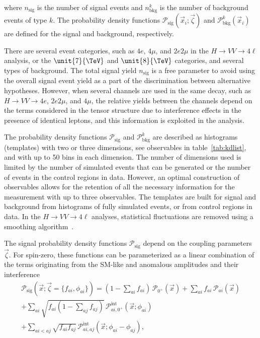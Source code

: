 where $n_\text{sig}$ is the number of signal events and $n_\text{bkg}^k$ is the number of background events of type $k$.
The probability density functions $\mathcal{P}_\text{sig}(\vec{x}_{i};\vec{\zeta})$ and $\mathcal{P}_\text{bkg}^k(\vec{x}_{i})$
are defined for the signal and background, respectively.

There are several event categories, such as $4e$, $4\mu$, and $2e2\mu$ in the
$H\to VV \to 4\ell$ analysis, or the $\unit{7}{\TeV}$ and $\unit{8}{\TeV}$ categories, and several types of background.
The total signal yield $n_\text{sig}$ is a free parameter to avoid
using the overall signal event yield as a part of the discrimination between alternative hypotheses.
However, when several channels are used in the same decay,
such as $H \to VV \to 4e$, $2e2\mu$, and $4\mu$,
the relative yields between the channels depend on the terms considered in the tensor structure
due to interference effects in the presence of identical leptons,
and this information is exploited in the analysis.

The probability density functions $\mathcal{P}_\text{sig}$ and  $\mathcal{P}_\text{bkg}^k$ are described
as histograms (templates) with two or three dimensions, see observables in table~\ref{tab:kdlist},
and with up to 50 bins in each dimension. The number of dimensions used is limited by the number
of simulated events that can be generated or the number of events in the control regions in data.
However, an optimal construction of observables allows for the retention of all the necessary information for
the measurement with up to three observables. The templates are built for signal and background from
histograms of fully simulated events, or from control regions in data. In the $H\to VV \to 4\ell$ analyses, statistical fluctuations are removed using a smoothing algorithm~\cite{rosenblatt1956, parzen1962}.

The signal probability density functions $\mathcal{P}_\text{sig}$ depend on the coupling parameters $\vec{\zeta}$.
For spin-zero, these functions can be parameterized as a linear combination of the terms originating from
the SM-like and anomalous amplitudes and their interference~\cite{Anderson:2013afp}
\begin{multline}
\mathcal{P}_\text{sig}\left(\vec{x}; \vec{\zeta}=\{f_{ai},\phi_{ai}\}\right) =  \left(1-\sum_{ai} f_{ai}\right) \, \mathcal{P}_{0^+}\left(\vec{x}\right)
 + \sum_{ai} f_{ai} \, \mathcal{P}_{ai}\left(\vec{x}\right)  \\
+ \sum_{ai} \sqrt{f_{ai}\left(1-\sum_{aj} f_{aj}\right)}\, \mathcal{P}^\text{int}_{ai,0^+}\left(\vec{x}; \phi_{ai}\right) \\
+ \sum_{ai<aj} \sqrt{f_{ai}f_{aj}} \, \mathcal{P}^\text{int}_{ai,aj}\left(\vec{x}; \phi_{ai}-\phi_{aj}\right),
\label{eq:fractions-general}
\end{multline}


